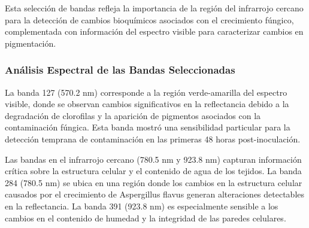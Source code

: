Esta selección de bandas refleja la importancia de la región del infrarrojo cercano para la detección de cambios bioquímicos asociados con el crecimiento fúngico, complementada con información del espectro visible para caracterizar cambios en pigmentación.

\subsubsection{Análisis Espectral de las Bandas Seleccionadas}

La banda 127 (570.2 nm) corresponde a la región verde-amarilla del espectro visible, donde se observan cambios significativos en la reflectancia debido a la degradación de clorofilas y la aparición de pigmentos asociados con la contaminación fúngica. Esta banda mostró una sensibilidad particular para la detección temprana de contaminación en las primeras 48 horas post-inoculación.

Las bandas en el infrarrojo cercano (780.5 nm y 923.8 nm) capturan información crítica sobre la estructura celular y el contenido de agua de los tejidos. La banda 284 (780.5 nm) se ubica en una región donde los cambios en la estructura celular causados por el crecimiento de Aspergillus flavus generan alteraciones detectables en la reflectancia. La banda 391 (923.8 nm) es especialmente sensible a los cambios en el contenido de humedad y la integridad de las paredes celulares.



